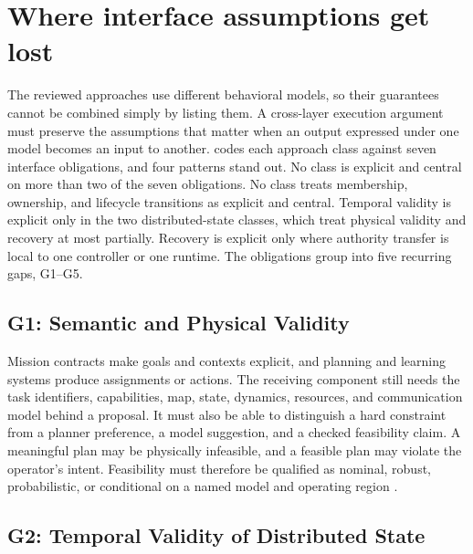 \section{Where interface assumptions get lost}
\label{sec:gaps}

The reviewed approaches use different behavioral models, so their guarantees
cannot be combined simply by listing them.  A cross-layer execution argument
must preserve the assumptions that matter when an output expressed under one
model becomes an input to another.   codes each approach
class against seven interface obligations, and four patterns stand out.  No
class is explicit and central on more than two of the seven obligations.  No
class treats membership, ownership, and lifecycle transitions as explicit and
central.  Temporal validity is explicit only in the two distributed-state
classes, which treat physical validity and recovery at most partially.  Recovery
is explicit only where authority transfer is local to one controller or one
runtime.  The obligations group into five recurring gaps, G1--G5.



\subsection{G1: Semantic and Physical Validity}

Mission contracts make goals and contexts explicit, and planning and learning
systems produce assignments or actions.  The receiving component still needs the
task identifiers, capabilities, map, state, dynamics, resources, and
communication model behind a proposal.  It must also be able to distinguish a
hard constraint from a planner preference, a model suggestion, and a checked
feasibility claim.  A meaningful plan may be physically infeasible, and a
feasible plan may violate the operator's intent.  Feasibility must therefore be
qualified as nominal, robust, probabilistic, or conditional on a named model and
operating region
\cite{mallozzi2020crome,mallozzi2023repair,mandi2024roco,obata2025lipllm,
chaki2013probabilistic}.

\subsection{G2: Temporal Validity of Distributed State}
\label{sec:gap-time}

